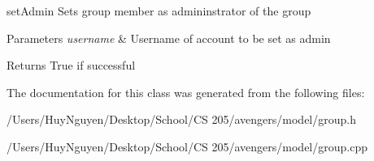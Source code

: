 set\+Admin Sets group member as admininstrator of the group 


\begin{DoxyParams}{Parameters}
{\em username} & Username of account to be set as admin \\
\hline
\end{DoxyParams}
\begin{DoxyReturn}{Returns}
True if successful 
\end{DoxyReturn}


The documentation for this class was generated from the following files\+:\begin{DoxyCompactItemize}
\item 
/\+Users/\+Huy\+Nguyen/\+Desktop/\+School/\+C\+S 205/avengers/model/group.\+h\item 
/\+Users/\+Huy\+Nguyen/\+Desktop/\+School/\+C\+S 205/avengers/model/group.\+cpp\end{DoxyCompactItemize}
